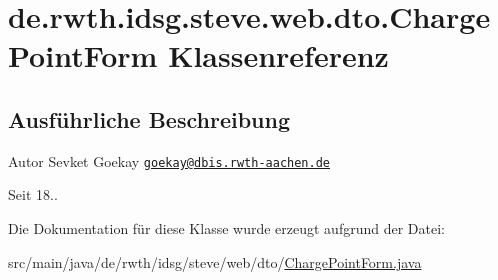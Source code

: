 \hypertarget{classde_1_1rwth_1_1idsg_1_1steve_1_1web_1_1dto_1_1_charge_point_form}{\section{de.\-rwth.\-idsg.\-steve.\-web.\-dto.\-Charge\-Point\-Form Klassenreferenz}
\label{classde_1_1rwth_1_1idsg_1_1steve_1_1web_1_1dto_1_1_charge_point_form}
}


\subsection{Ausführliche Beschreibung}
\begin{DoxyAuthor}{Autor}
Sevket Goekay \href{mailto:goekay@dbis.rwth-aachen.de}{\tt goekay@dbis.\-rwth-\/aachen.\-de} 
\end{DoxyAuthor}
\begin{DoxySince}{Seit}
18.. 
\end{DoxySince}


Die Dokumentation für diese Klasse wurde erzeugt aufgrund der Datei\-:\begin{DoxyCompactItemize}
\item 
src/main/java/de/rwth/idsg/steve/web/dto/\hyperlink{_charge_point_form_8java}{Charge\-Point\-Form.\-java}\end{DoxyCompactItemize}
